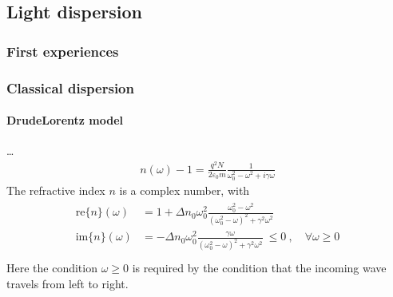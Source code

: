 \documentclass[letterpaper,10pt,english]{jupyterBook}
\begin{document}
\sphinxstepscope


\subsection{Light dispersion}
\label{\detokenize{ch/quantum-mechanics/history/light-dispersion:light-dispersion}}\label{\detokenize{ch/quantum-mechanics/history/light-dispersion:quantum-mechanics-history-dispersion}}\label{\detokenize{ch/quantum-mechanics/history/light-dispersion::doc}}

\subsubsection{First experiences}
\label{\detokenize{ch/quantum-mechanics/history/light-dispersion:first-experiences}}

\subsubsection{Classical dispersion}
\label{\detokenize{ch/quantum-mechanics/history/light-dispersion:classical-dispersion}}\label{\detokenize{ch/quantum-mechanics/history/light-dispersion:quantum-mechanics-history-dispersion-classical}}

\paragraph{Drude\sphinxhyphen{}Lorentz model}
\label{\detokenize{ch/quantum-mechanics/history/light-dispersion:drude-lorentz-model}}\label{\detokenize{ch/quantum-mechanics/history/light-dispersion:quantum-mechanics-history-dispersion-classical-drude-lorentz}}
\sphinxAtStartPar
…
\begin{equation*}
\begin{split}n(\omega)-1 = \frac{q^2 N}{2 \varepsilon_0 m} \frac{1}{\omega_0^2 - \omega^2 + i \gamma \omega}\end{split}
\end{equation*}
\sphinxAtStartPar
{} The refractive index \(n\) is a complex number, with
\begin{equation*}
\begin{split}\begin{aligned}
  \text{re} \{ n \}(\omega) & = 1 + \Delta n_0 \omega^2_0 \frac{\omega_0^2 - \omega^2}{(\omega_0^2 - \omega)^2 + \gamma^2 \omega^2} \\
  \text{im} \{ n \}(\omega) & = - \Delta n_0 \omega^2_0 \frac{\gamma \omega}{(\omega_0^2 - \omega)^2 + \gamma^2 \omega^2} \ \le 0 \ , \quad \forall \omega \ge 0 \\
\end{aligned}\end{split}
\end{equation*}
\sphinxAtStartPar
Here the condition \(\omega \ge 0\) is required by the condition that the incoming wave travels from left to right.
\end{document}
